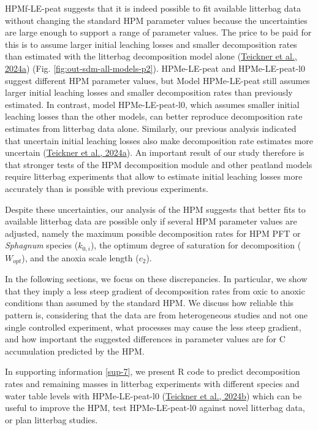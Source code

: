\documentclass[
  12pt,
]{article}
\begin{document}
HPMf-LE-peat suggests that it is indeed possible to fit available litterbag data without changing the standard HPM parameter values because the uncertainties are large enough to support a range of parameter values. The price to be paid for this is to assume larger initial leaching losses and smaller decomposition rates than estimated with the litterbag decomposition model alone (\protect\hyperlink{ref-Teickner.2024}{Teickner et al., 2024a}) (Fig. \ref{fig:out-sdm-all-models-p2}). HPMe-LE-peat and HPMe-LE-peat-l0 suggest different HPM parameter values, but Model HPMe-LE-peat still assumes larger initial leaching losses and smaller decomposition rates than previously estimated. In contrast, model HPMe-LE-peat-l0, which assumes smaller initial leaching losses than the other models, can better reproduce decomposition rate estimates from litterbag data alone. Similarly, our previous analysis indicated that uncertain initial leaching losses also make decomposition rate estimates more uncertain (\protect\hyperlink{ref-Teickner.2024}{Teickner et al., 2024a}). An important result of our study therefore is that stronger tests of the HPM decomposition module and other peatland models require litterbag experiments that allow to estimate initial leaching losses more accurately than is possible with previous experiments.

Despite these uncertainties, our analysis of the HPM suggests that better fits to available litterbag data are possible only if several HPM parameter values are adjusted, namely the maximum possible decomposition rates for HPM PFT or \emph{Sphagnum} species (\(k_{0,i}\)), the optimum degree of saturation for decomposition (\(W_{opt}\)), and the anoxia scale length (\(c_2\)).

In the following sections, we focus on these discrepancies. In particular, we show that they imply a less steep gradient of decomposition rates from oxic to anoxic conditions than assumed by the standard HPM. We discuss how reliable this pattern is, considering that the data are from heterogeneous studies and not one single controlled experiment, what processes may cause the less steep gradient, and how important the suggested differences in parameter values are for C accumulation predicted by the HPM.

In supporting information \ref{sup-7}, we present R code to predict decomposition rates and remaining masses in litterbag experiments with different species and water table levels with HPMe-LE-peat-l0 (\protect\hyperlink{ref-Teickner.2024b}{Teickner et al., 2024b}) which can be useful to improve the HPM, test HPMe-LE-peat-l0 against novel litterbag data, or plan litterbag studies.
\end{document}
